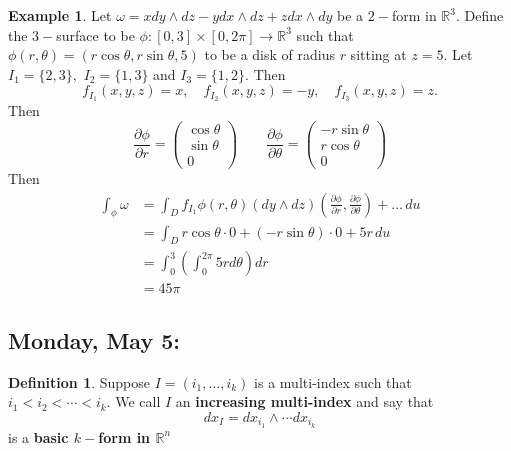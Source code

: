 \documentclass[10pt, oneside]{article}
\newcommand{\bbR}{\mathbb{R}}
\theoremstyle{definition}
\newtheorem{exmp}{Example}[section]
\newtheorem{defn}{Definition}
\begin{document}
\begin{exmp}
    Let $\omega = x dy \wedge dz - y dx \wedge dz + zdx \wedge dy$ be a $2-$form in $\bbR^3.$ Define the $3-$surface to be $\phi:[0,3] \times [0,2\pi] \to \bbR^3$ such that $\phi(r,\theta) = (r\cos \theta, r\sin \theta, 5)$ to be a disk of radius $r$ sitting at $z = 5.$ Let $I_1 = \{2,3\},$ $I_2 = \{1,3\}$ and $I_3 = \{1,2\}.$ Then 
    \[f_{I_1}(x,y,z) = x, \quad f_{I_2}(x,y,z) = -y, \quad f_{I_3}(x,y,z) = z.\] Then 
    \[\frac{\partial \phi}{\partial r} = \begin{pmatrix}
        \cos\theta\\
        \sin \theta\\
        0
    \end{pmatrix}\qquad \frac{\partial \phi}{\partial \theta} = \begin{pmatrix}
        -r\sin \theta\\
        r\cos \theta\\
        0
    \end{pmatrix}\] Then 
    \begin{align*}
        \int_\phi \omega &= \int_D f_{I_1}\phi(r,\theta)(dy \wedge dz)(\frac{\partial \phi}{\partial r}, \frac{\partial \phi}{\partial \theta}) + \dots \,du\\
        &= \int_D r\cos\theta\cdot 0 + (-r\sin \theta)\cdot 0+ 5r\, du\\
        &= \int_0^{3}\left(\int_0^{2\pi} 5r d\theta\right) dr\\
        &= 45 \pi
    \end{align*}
\end{exmp}


\newpage
\subsection*{Monday, May 5: }

\begin{defn}
    Suppose $I = (i_1, \dots, i_k)$ is a multi-index such that $i_1 < i_2< \cdots < i_k.$ We call $I$ an \textbf{increasing multi-index} and say that 
    \[dx_I =dx_{i_1} \wedge \cdots dx_{i_k}\] is a \textbf{basic $k-$form in $\bbR^n$}
\end{defn}
\end{document}
